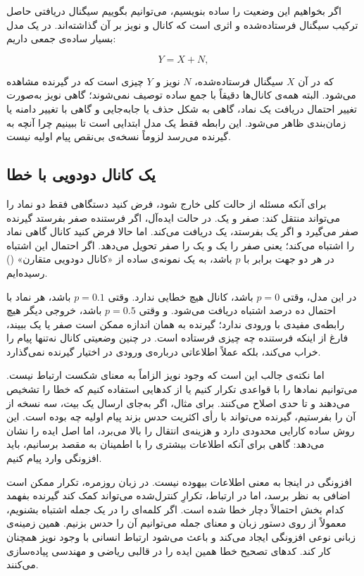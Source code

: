 اگر بخواهیم این وضعیت را ساده بنویسیم، می‌توانیم بگوییم سیگنال دریافتی حاصل ترکیب سیگنال فرستاده‌شده و اثری است که کانال و نویز بر آن گذاشته‌اند. در یک مدل بسیار ساده‌ی جمعی داریم:

\[
Y = X + N,
\]

که در آن \(X\) سیگنال فرستاده‌شده، \(N\) نویز و \(Y\) چیزی است که در گیرنده مشاهده می‌شود. البته همه‌ی کانال‌ها دقیقاً با جمع ساده توصیف نمی‌شوند؛ گاهی نویز به‌صورت تغییر احتمال دریافت یک نماد، گاهی به شکل حذف یا جابه‌جایی و گاهی با تغییر دامنه یا زمان‌بندی ظاهر می‌شود. این رابطه فقط یک مدل ابتدایی است تا ببینیم چرا آنچه به گیرنده می‌رسد لزوماً نسخه‌ی بی‌نقص پیام اولیه نیست.

\subsection{یک کانال دودویی با خطا}
\label{sub:binary-symmetric-channel}

برای آنکه مسئله از حالت کلی خارج شود، فرض کنید دستگاهی فقط دو نماد را می‌تواند منتقل کند: صفر و یک. در حالت ایده‌آل، اگر فرستنده صفر بفرستد گیرنده صفر می‌گیرد و اگر یک بفرستد، یک دریافت می‌کند. اما حالا فرض کنید کانال گاهی نماد را اشتباه می‌کند؛ یعنی صفر را یک و یک را صفر تحویل می‌دهد. اگر احتمال این اشتباه در هر دو جهت برابر با \(p\) باشد، به یک نمونه‌ی ساده از «کانال دودویی متقارن» () رسیده‌ایم.

در این مدل، وقتی \(p=0\) باشد، کانال هیچ خطایی ندارد. وقتی \(p=0.1\) باشد، هر نماد با احتمال ده درصد اشتباه دریافت می‌شود. و وقتی \(p=0.5\) باشد، خروجی دیگر هیچ رابطه‌ی مفیدی با ورودی ندارد؛ گیرنده به همان اندازه ممکن است صفر یا یک ببیند، فارغ از اینکه فرستنده چه چیزی فرستاده است. در چنین وضعیتی کانال نه‌تنها پیام را خراب می‌کند، بلکه عملاً اطلاعاتی درباره‌ی ورودی در اختیار گیرنده نمی‌گذارد.

اما نکته‌ی جالب این است که وجود نویز الزاماً به معنای شکست ارتباط نیست. می‌توانیم نمادها را با قواعدی تکرار کنیم یا از کدهایی استفاده کنیم که خطا را تشخیص می‌دهند و تا حدی اصلاح می‌کنند. برای مثال، اگر به‌جای ارسال یک بیت، سه نسخه از آن را بفرستیم، گیرنده می‌تواند با رأی اکثریت حدس بزند پیام اولیه چه بوده است. این روش ساده کارایی محدودی دارد و هزینه‌ی انتقال را بالا می‌برد، اما اصل ایده را نشان می‌دهد: گاهی برای آنکه اطلاعات بیشتری را با اطمینان به مقصد برسانیم، باید افزونگی وارد پیام کنیم.

افزونگی در اینجا به معنی اطلاعات بیهوده نیست. در زبان روزمره، تکرار ممکن است اضافی به نظر برسد، اما در ارتباط، تکرارِ کنترل‌شده می‌تواند کمک کند گیرنده بفهمد کدام بخش احتمالاً دچار خطا شده است. اگر کلمه‌ای را در یک جمله اشتباه بشنویم، معمولاً از روی دستور زبان و معنای جمله می‌توانیم آن را حدس بزنیم. همین زمینه‌ی زبانی نوعی افزونگی ایجاد می‌کند و باعث می‌شود ارتباط انسانی با وجود نویز همچنان کار کند. کدهای تصحیح خطا همین ایده را در قالبی ریاضی و مهندسی پیاده‌سازی می‌کنند. \autocite{shannon1948b,cover2006}

